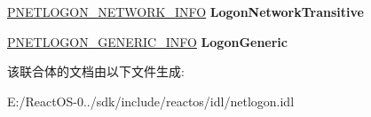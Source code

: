 \begin{DoxyCompactItemize}
\item 
\mbox{\label{union___n_e_t_l_o_g_o_n___l_e_v_e_l_a5df99acaf6dc674b5eb32ff4f5828cac}} 
\hyperlink{struct___n_e_t_l_o_g_o_n___n_e_t_w_o_r_k___i_n_f_o}{P\+N\+E\+T\+L\+O\+G\+O\+N\+\_\+\+N\+E\+T\+W\+O\+R\+K\+\_\+\+I\+N\+FO} {\bfseries Logon\+Network\+Transitive}
\item 
\mbox{\label{union___n_e_t_l_o_g_o_n___l_e_v_e_l_a9d303ef264dba595257ecd0e5a376f3e}} 
\hyperlink{struct___n_e_t_l_o_g_o_n___g_e_n_e_r_i_c___i_n_f_o}{P\+N\+E\+T\+L\+O\+G\+O\+N\+\_\+\+G\+E\+N\+E\+R\+I\+C\+\_\+\+I\+N\+FO} {\bfseries Logon\+Generic}
\end{DoxyCompactItemize}


该联合体的文档由以下文件生成\+:\begin{DoxyCompactItemize}
\item 
E\+:/\+React\+O\+S-\/0../sdk/include/reactos/idl/netlogon.\+idl\end{DoxyCompactItemize}
